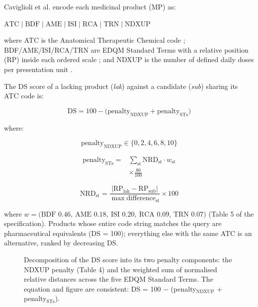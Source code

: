\documentclass[twocolumn,a4paper]{elsarticle}
\begin{document}
Caviglioli et al.\citep{caviglioli2025medicine} encode each medicinal product (MP) as:

\(\text{ATC} \mid \text{BDF} \mid \text{AME} \mid \text{ISI} \mid \text{RCA} \mid \text{TRN} \mid \text{NDXUP}\)

where ATC is the Anatomical Therapeutic Chemical code \citep{who2026atcddd}; BDF/AME/ISI/RCA/TRN are EDQM Standard Terms with a relative position (RP) inside each ordered scale \citep{edqm2024standard,iso202311239}; and NDXUP is the number of defined daily doses per presentation unit \citep{who2026atcddd}.

The DS score of a lacking product (\emph{lak}) against a candidate (\emph{sub}) sharing its ATC code is:

\begin{equation}
\text{DS} = 100 - \bigl(\text{penalty}_{\text{NDXUP}} + \text{penalty}_{\text{STs}}\bigr)
\label{eq:ds}
\end{equation}

where:

\begin{equation}
\text{penalty}_{\text{NDXUP}} \in \{0,2,4,6,8,10\}
\label{eq:ndxup}
\end{equation}

\begin{equation}
\begin{split}
\text{penalty}_{\text{STs}} = {} & \sum_{\text{st}} \text{NRD}_{\text{st}} \cdot w_{\text{st}} \\
& \times \frac{80}{100}
\end{split}
\label{eq:st}
\end{equation}

\begin{equation}
\text{NRD}_{\text{st}} = \frac{|\text{RP}_{\text{lak}} - \text{RP}_{\text{sub}}|}{\max\text{difference}_{\text{st}}} \times 100
\label{eq:nrd}
\end{equation}

where $w = (\text{BDF }0.46,\ \text{AME }0.18,\ \text{ISI }0.20,\ \text{RCA }0.09$,
$\text{TRN }0.07)$ (Table 5 of the specification). Products whose entire code string matches the query are pharmaceutical equivalents (DS = 100); everything else with the same ATC is an alternative, ranked by decreasing DS.

\begin{figure}[htbp]
\centering
\resizebox{\columnwidth}{!}{%
%
}
\caption{Decomposition of the DS score into its two penalty components: the NDXUP penalty (Table 4) and the weighted sum of normalised relative distances across the five EDQM Standard Terms. The equation and figure are consistent: DS = 100 $-$ (penalty$_{\text{NDXUP}}$ + penalty$_{\text{STs}}$).}
\label{fig:ds-formula}
\end{figure}
\end{document}
